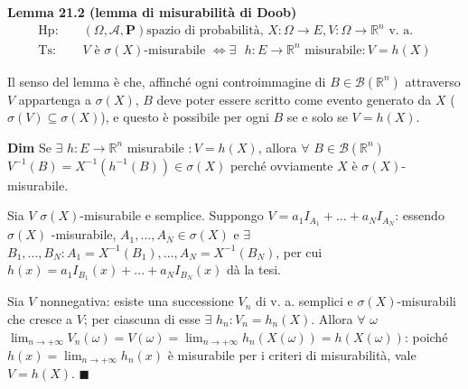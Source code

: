 \documentclass{article}
\begin{document}
\textbf{Lemma 21.2 (lemma di misurabilit\`{a} di Doob)}%
\begin{eqnarray*}
\text{Hp}\text{: } &&\left( \Omega ,\mathcal{A},\mathbf{P}\right) \text{
spazio di probabilit\`{a}, }X:\Omega \rightarrow E,V:\Omega \rightarrow 
\mathbb{R}
^{n}\text{ v. a.} \\
\text{Ts}\text{: } &&V\text{ \`{e} }\sigma \left( X\right) \text{-misurabile 
}\Longleftrightarrow \exists \text{ }h:E\rightarrow 
\mathbb{R}
^{n}\text{ misurabile}:V=h\left( X\right)
\end{eqnarray*}

Il senso del lemma \`{e} che, affinch\'{e} ogni controimmagine di $B\in 
\mathcal{B}\left( 
\mathbb{R}
^{n}\right) $ attraverso $V$ appartenga a $\sigma \left( X\right) $, $B$
deve poter essere scritto come evento generato da $X$ ($\sigma \left(
V\right) \subseteq \sigma \left( X\right) $), e questo \`{e} possibile per
ogni $B$ se e solo se $V=h\left( X\right) $.

\textbf{Dim} Se $\exists $ $h:E\rightarrow 
\mathbb{R}
^{n}$ misurabile $:V=h\left( X\right) $, allora $\forall $ $B\in \mathcal{B}%
\left( 
\mathbb{R}
^{n}\right) $ $V^{-1}\left( B\right) =X^{-1}\left( h^{-1}\left( B\right)
\right) \in \sigma \left( X\right) $ perch\'{e} ovviamente $X$ \`{e} $\sigma
\left( X\right) $-misurabile.

Sia $V$ $\sigma \left( X\right) $-misurabile e semplice. Suppongo $%
V=a_{1}I_{A_{1}}+...+a_{N}I_{A_{N}}$: essendo $\sigma \left( X\right) $%
-misurabile, $A_{1},...,A_{N}\in \sigma \left( X\right) $ e $\exists $ $%
B_{1},...,B_{N}:A_{1}=X^{-1}\left( B_{1}\right) ,...,A_{N}=X^{-1}\left(
B_{N}\right) $, per cui $h\left( x\right) =a_{1}I_{B_{1}}\left( x\right)
+...+a_{N}I_{B_{N}}\left( x\right) $ d\`{a} la tesi.

Sia $V$ nonnegativa: esiste una successione $V_{n}$ di v. a. semplici e $%
\sigma \left( X\right) $-misurabili che cresce a $V$; per ciascuna di esse $%
\exists $ $h_{n}:V_{n}=h_{n}\left( X\right) $. Allora $\forall $ $\omega $ $%
\lim_{n\rightarrow +\infty }V_{n}\left( \omega \right) =V\left( \omega
\right) =\lim_{n\rightarrow +\infty }h_{n}\left( X\left( \omega \right)
\right) =h\left( X\left( \omega \right) \right) $: poich\'{e} $h\left(
x\right) =\lim_{n\rightarrow +\infty }h_{n}\left( x\right) $ \`{e}
misurabile per i criteri di misurabilit\`{a}, vale $V=h\left( X\right) $. $%
\blacksquare $
\end{document}
